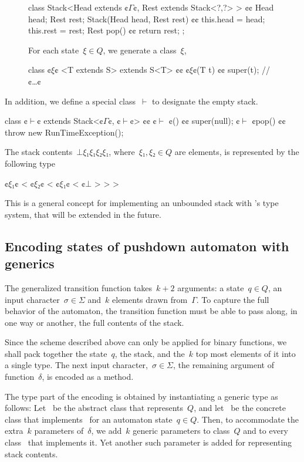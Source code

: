 \begin{figure}[H]
\begin{JAVA}
class Stack<Head extends ¢$Γ$¢, Rest extends Stack<?,?> > {¢¢
  Head head;
  Rest rest;
  Stack(Head head, Rest rest) {¢¢ this.head = head; this.rest = rest;}
  Rest pop() {¢¢ return rest; };
}
\end{JAVA}
For each state~$ξ∈Q$, we generate a \Java class~$ξ$,
\begin{JAVA}
class ¢$ξ$¢ <T extends S> extends S<T> {¢¢
  ¢$ξ$¢(T t) {¢¢ super(t); }
  // ¢…¢
}
\end{JAVA}
\end{figure}
In addition, we define a special class~$\vdash$ to designate the empty stack.
\begin{JAVA}
class ¢$\vdash$¢ extends Stack<¢$Γ$¢, ¢$\vdash$¢> {¢¢
  ¢$\vdash$ ¢() {¢¢ super(null); }
  ¢$\vdash$ ¢pop() {¢¢ throw new RunTimeException(); }
}
\end{JAVA}
The stack contents~$⊥ξ₁ξ₁ξ₂ξ₁$,
where~$ξ₁,ξ₂∈Q$ are elements,
is represented by the following type
\begin{JAVA}
  ¢$ξ₁$¢ < ¢$ξ₂$¢ < ¢$ξ₁$¢ < ¢$⊥$ > > >
\end{JAVA}
This is a general concept for implementing an unbounded stack with \Java's type system,
that will be extended in the future.

\subsection{Encoding states of pushdown automaton with \Java generics}
The generalized transition function
  takes~$k+2$ arguments: a state~$q∈Q$, an input character~$σ∈Σ$
    and~$k$ elements drawn from~$Γ$.
To capture the full behavior of the automaton, the transition function
  must be able to pass along, in one way or another, the full contents of the stack.

Since the scheme described above can only be applied for binary functions,
  we shall pack together the state~$q$, the stack, and the~$k$ top most
  elements of it into a single type.
The next input character,~$σ∈Σ$, the remaining argument of function~$δ$,
  is encoded as a method.

The type part of the encoding is obtained by instantiating a generic type as follows:
Let~ be the abstract class that represents~$Q$, and let~ be the concrete class that
  implements~ for an automaton state~$q∈Q$.
Then, to accommodate the extra~$k$ parameters of~$δ$, we add~$k$ generic parameters
  to class~$Q$ and to every class~ that implements it.
Yet another such parameter is added for representing stack contents.

